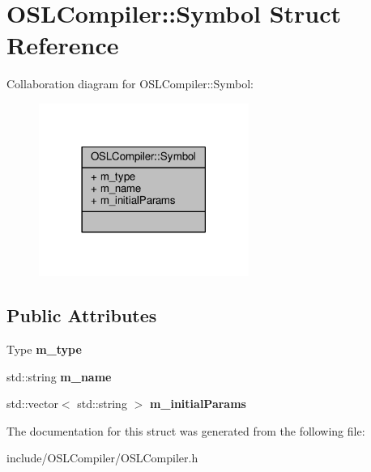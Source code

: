 \hypertarget{struct_o_s_l_compiler_1_1_symbol}{\section{O\-S\-L\-Compiler\-:\-:Symbol Struct Reference}
\label{struct_o_s_l_compiler_1_1_symbol}
}


Collaboration diagram for O\-S\-L\-Compiler\-:\-:Symbol\-:
\nopagebreak
\begin{figure}[H]
\begin{center}
\leavevmode
\includegraphics[width=194pt]{struct_o_s_l_compiler_1_1_symbol__coll__graph}
\end{center}
\end{figure}
\subsection*{Public Attributes}
\begin{DoxyCompactItemize}
\item 
\hypertarget{struct_o_s_l_compiler_1_1_symbol_a6b3db58a2fe6abb95757fb7f5a00ef5d}{Type {\bfseries m\-\_\-type}}\label{struct_o_s_l_compiler_1_1_symbol_a6b3db58a2fe6abb95757fb7f5a00ef5d}

\item 
\hypertarget{struct_o_s_l_compiler_1_1_symbol_a73c393dfda3d414afa2864aeead2f03c}{std\-::string {\bfseries m\-\_\-name}}\label{struct_o_s_l_compiler_1_1_symbol_a73c393dfda3d414afa2864aeead2f03c}

\item 
\hypertarget{struct_o_s_l_compiler_1_1_symbol_ad09e4a4a5bad1dd8a66193e239f0fe1f}{std\-::vector$<$ std\-::string $>$ {\bfseries m\-\_\-initial\-Params}}\label{struct_o_s_l_compiler_1_1_symbol_ad09e4a4a5bad1dd8a66193e239f0fe1f}

\end{DoxyCompactItemize}


The documentation for this struct was generated from the following file\-:\begin{DoxyCompactItemize}
\item 
include/\-O\-S\-L\-Compiler/O\-S\-L\-Compiler.\-h\end{DoxyCompactItemize}
